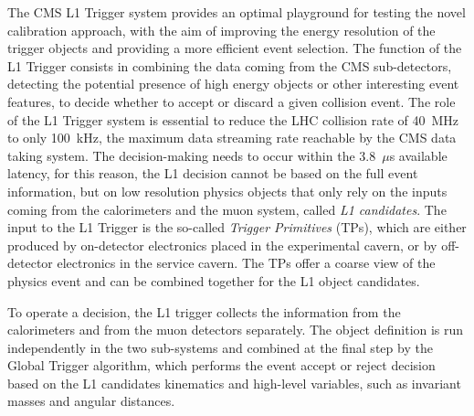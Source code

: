 The CMS L1 Trigger system provides an optimal playground for testing the novel calibration approach, with the aim of improving the energy resolution of the trigger objects and providing a more efficient event selection.
The function of the L1 Trigger consists in combining the data coming from the CMS sub-detectors, detecting the potential presence of high energy objects or other interesting event features, to decide whether to accept or discard a given collision event. The role of the L1 Trigger system is essential to reduce the LHC collision rate of 40~MHz to only 100~kHz, the maximum data streaming rate reachable by the CMS data taking system.
The decision-making needs to occur within the 3.8~$\mu$s available latency, for this reason, the L1 decision cannot be based on the full event information, but on low resolution physics objects that only rely on the inputs coming from the calorimeters and the muon system, called \textit{L1 candidates}.
The input to the L1 Trigger is the so-called \textit{Trigger Primitives} (TPs), which are either produced by on-detector electronics placed in the experimental cavern, or by off-detector electronics in the service cavern. The TPs offer a coarse view of the physics event and can be combined together for the L1 object candidates. 

To operate a decision, the L1 trigger collects the information from the calorimeters and from the muon detectors separately. The object definition is run independently in the two sub-systems and combined at the final step by the Global Trigger algorithm, which performs the event accept or reject decision based on the L1 candidates kinematics and high-level variables, such as invariant masses and angular distances.


